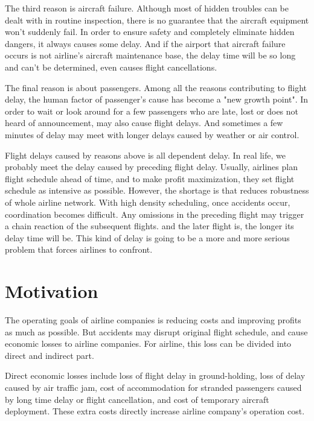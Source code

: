 \documentclass[senior]{IPSstyle}
\begin{document}
The third reason is aircraft failure.
Although most of hidden troubles can be dealt with in routine inspection, there is no guarantee that the aircraft equipment won’t suddenly fail. 
In order to ensure safety and completely eliminate hidden dangers, it always causes some delay. 
And if the airport that aircraft failure occurs is not airline’s aircraft maintenance base, the delay time will be so long and can’t be determined, even causes flight cancellations. 

The final reason is about passengers. 
Among all the reasons contributing to flight delay, the human factor of passenger's cause has become a "new growth point".
In order to wait or look around for a few passengers who are late, lost or does not heard of announcement, may also cause flight delays.
And sometimes a few minutes of delay may meet with longer delays caused by weather or air control.

Flight delays caused by reasons above is all dependent delay. In real life, we probably meet the delay caused by preceding flight delay. 
Usually, airlines plan flight schedule ahead of time, and to make profit maximization, they set flight schedule as intensive as possible. 
However, the shortage is that reduces robustness of whole airline network. With high density scheduling, once accidents occur, coordination becomes difficult.
Any omissions in the preceding flight may trigger a chain reaction of the subsequent flights. and the later flight is, the longer its delay time will be.
This kind of delay is going to be a more and more serious problem that forces airlines to confront.



\section{Motivation}
The operating goals of airline companies is reducing costs and improving profits as much as possible.
But accidents may disrupt original flight schedule, and cause economic losses to airline companies.
For airline, this loss can be divided into direct and indirect part.

Direct economic losses include loss of flight delay in ground-holding, loss of delay caused by air traffic jam, cost of accommodation for stranded passengers caused by long time delay or flight cancellation, and cost of temporary aircraft deployment. These extra costs directly increase airline company’s operation cost. 
\end{document}
